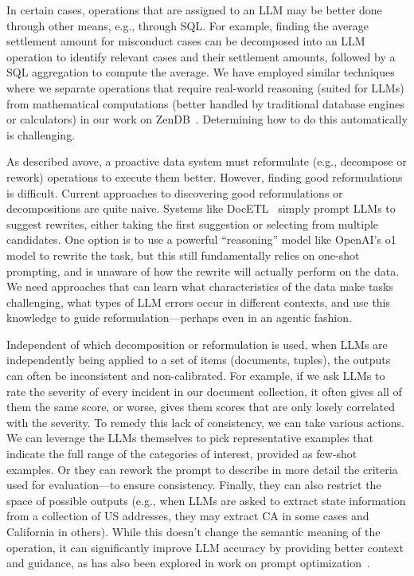 In certain cases, operations
that are assigned to an LLM may be better done
through other means, e.g., through SQL.
For example, finding the average settlement amount 
for misconduct cases can be decomposed 
into an LLM operation to 
identify relevant cases and their settlement amounts, 
followed by a SQL aggregation to compute the average.
We have employed similar techniques where
we separate operations that require real-world reasoning (suited for LLMs) from mathematical computations (better handled by traditional database engines or calculators) in
our work on ZenDB~\cite{lin2024towards}.
Determining how to do this automatically
is challenging. 

As described avove, a proactive data system
must reformulate (e.g., decompose or rework) operations to 
execute them better. 
However, finding good reformulations is difficult. 
Current approaches to discovering good reformulations 
or decompositions
are quite naive. Systems like DocETL~\cite{shankar2024docetl} 
simply prompt LLMs to suggest rewrites, 
either taking the first 
suggestion or selecting from multiple candidates. One option is 
to use a powerful ``reasoning'' model like OpenAI's o1 model to 
rewrite the task, but this still fundamentally relies on one-shot 
prompting, and is unaware of how the rewrite will actually perform on the data. We need approaches that can learn what 
characteristics of the data make tasks challenging, what types of 
LLM errors occur in different contexts, and use this knowledge to 
guide reformulation---perhaps even in an agentic fashion.

Independent of which decomposition or reformulation is used,
when LLMs are independently being applied
to a set of items (documents, tuples),
the outputs can often be
inconsistent and non-calibrated.
For example, if we ask LLMs to rate
the severity of every incident
in our document collection,
it often gives all of them the same score,
or worse, gives them scores that
are only losely correlated with the severity.
To remedy this lack of consistency,
we can take various actions.
We can leverage the LLMs themselves to pick 
representative examples that indicate
the full range of the categories of interest, provided
as few-shot examples.
Or they can rework the prompt to describe in more detail
the criteria used for evaluation---to ensure consistency.
Finally, they can also
restrict the space of possible outputs
(e.g., when LLMs are asked to extract state information
from a collection of US addresses, they may extract CA in some
cases and California in others).
While this doesn't change the semantic meaning of the operation, it can significantly improve LLM accuracy by providing better context and guidance, as has
also been explored in work on prompt optimization~\cite{khattab2023dspy}.

